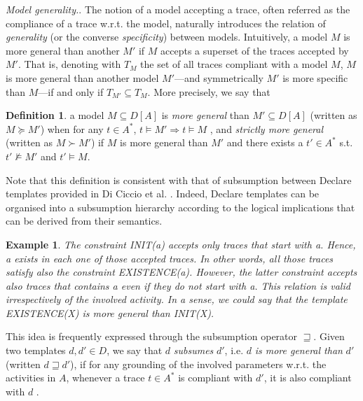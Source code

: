 \documentclass[a4wide,11pt]{article}
\theoremstyle{definition}
\newtheorem{definition}{Definition}[section]
\theoremstyle{plain}
\newtheorem{example}{Example}[section]
\newcommand\paragrafo[1]{{\smallskip \noindent \textit{#1}.}}
\begin{document}
\paragrafo{Model generality.} The notion of a model accepting a trace, often referred as the compliance of a trace w.r.t. the model, naturally introduces the relation of \emph{generality} (or the converse \emph{specificity}) between models.
%
Intuitively, a model $M$ is more general than another $M'$ if $M$ accepts a superset of the traces accepted by $M'$. That is, denoting with $T_M$ the set of all traces compliant with a model $M$, $M$ is more general than another model $M'$---and symmetrically $M'$ is more specific than $M$---if and only if $T_{M'} \subseteq T_M$. 
%
More precisely, we say that 
\theoremstyle{definition}\label{def:generality}
\begin{definition}{}
a model $M\subseteq D[A]$ is \emph{more general} than $M'\subseteq D[A]$ (written as $M \succeq M'$) when for any $t\in A^*$, $t\models M' \Rightarrow t\models M$ , and \emph{strictly more general} (written as $M \succ M'$) if $M$ is more general than $M'$ and there exists a $t'\in A^*$ s.t.\ $t'\not\models M'$ and $t'\models M$.
\end{definition}

Note that this definition is consistent with that of subsumption between Declare templates provided in Di Ciccio et al. \cite{2017-DiCiccio}. Indeed, Declare templates can be organised into a subsumption hierarchy according to the logical implications that can be derived from their semantics.
%
\begin{example}{}
The constraint \textsf{INIT(a)} accepts only traces that start with \textsf{a}. Hence, \textsf{a} exists in each one of those accepted traces. In other words, all those traces satisfy also the constraint \textsf{EXISTENCE(a)}. However, the latter constraint accepts also traces that contains \textsf{a} even if they do not start with \textsf{a}. This relation is valid irrespectively of the involved activity. In a sense, we could say that the template \textsf{EXISTENCE(X)} is \emph{more general} than \textsf{INIT(X)}.
\end{example}
This idea is frequently expressed through the subsumption operator $\sqsupseteq$. Given two templates $d, d' \in D$, we say that $d$ \emph{subsumes} $d'$, i.e. $d$ \emph{is more general than} $d'$ (written $d\sqsupseteq d'$), if for any grounding of the involved parameters w.r.t. the activities in $A$, whenever a trace $t \in A^*$ is compliant with $d'$, it is also compliant with $d$ \cite{2017-DiCiccio} .
\end{document}
